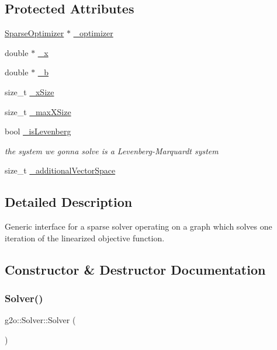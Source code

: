 \subsection*{Protected Attributes}
\begin{DoxyCompactItemize}
\item 
\mbox{\hyperlink{classg2o_1_1_sparse_optimizer}{Sparse\+Optimizer}} $\ast$ \mbox{\hyperlink{classg2o_1_1_solver_aff3275985d996329df15070348c21292}{\+\_\+optimizer}}
\item 
double $\ast$ \mbox{\hyperlink{classg2o_1_1_solver_a94ee5e303a754f4ff338a7b032c214ae}{\+\_\+x}}
\item 
double $\ast$ \mbox{\hyperlink{classg2o_1_1_solver_a52c92c9bf5db0da3322da3a02dbeb245}{\+\_\+b}}
\item 
size\+\_\+t \mbox{\hyperlink{classg2o_1_1_solver_abcf7731347f14915bd9ba963021ea830}{\+\_\+x\+Size}}
\item 
size\+\_\+t \mbox{\hyperlink{classg2o_1_1_solver_a263003f9053537f92d5d019ce5c53771}{\+\_\+max\+X\+Size}}
\item 
bool \mbox{\hyperlink{classg2o_1_1_solver_a8b7f6d4e00e3734f5ed9bd3dfac201a6}{\+\_\+is\+Levenberg}}
\begin{DoxyCompactList}\small\item\em the system we gonna solve is a Levenberg-\/\+Marquardt system \end{DoxyCompactList}\item 
size\+\_\+t \mbox{\hyperlink{classg2o_1_1_solver_a6a1492959487c279747a8f3097a5f04e}{\+\_\+additional\+Vector\+Space}}
\end{DoxyCompactItemize}


\subsection{Detailed Description}
Generic interface for a sparse solver operating on a graph which solves one iteration of the linearized objective function. 

\subsection{Constructor \& Destructor Documentation}
\mbox{\label{classg2o_1_1_solver_af097bdf5c8dc4bb017a2cec4038d5a56}} 
\subsubsection{\texorpdfstring{Solver()}{Solver()}}
{\footnotesize\ttfamily g2o\+::\+Solver\+::\+Solver (\begin{DoxyParamCaption}{ }\end{DoxyParamCaption})}

